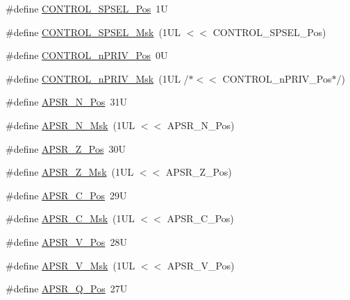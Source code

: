 \begin{DoxyCompactItemize}
\item 
\#define \hyperlink{group___c_m_s_i_s___c_o_r_e_ga07eafc53e609895342c6a530e9d01310}{C\+O\+N\+T\+R\+O\+L\+\_\+\+S\+P\+S\+E\+L\+\_\+\+Pos}~1U
\item 
\#define \hyperlink{group___c_m_s_i_s___c_o_r_e_ga70b29840969b06909da21369b0b05b53}{C\+O\+N\+T\+R\+O\+L\+\_\+\+S\+P\+S\+E\+L\+\_\+\+Msk}~(1\+U\+L $<$$<$ C\+O\+N\+T\+R\+O\+L\+\_\+\+S\+P\+S\+E\+L\+\_\+\+Pos)
\item 
\#define \hyperlink{group___c_m_s_i_s___c_o_r_e_ga51b95bc03ec0d815b459bde0b14a5908}{C\+O\+N\+T\+R\+O\+L\+\_\+n\+P\+R\+I\+V\+\_\+\+Pos}~0U
\item 
\#define \hyperlink{group___c_m_s_i_s___c_o_r_e_gaef3b20d77acb213338f89ce5e7bc36b0}{C\+O\+N\+T\+R\+O\+L\+\_\+n\+P\+R\+I\+V\+\_\+\+Msk}~(1\+U\+L /$\ast$$<$$<$ C\+O\+N\+T\+R\+O\+L\+\_\+n\+P\+R\+I\+V\+\_\+\+Pos$\ast$/)
\item 
\#define \hyperlink{group___c_m_s_i_s___c_o_r_e_gac469528d210043c7bd3f12f0e6824766}{A\+P\+S\+R\+\_\+\+N\+\_\+\+Pos}~31U
\item 
\#define \hyperlink{group___c_m_s_i_s___c_o_r_e_gadbc2cf55a026f661b53fadfcf822cef1}{A\+P\+S\+R\+\_\+\+N\+\_\+\+Msk}~(1\+U\+L $<$$<$ A\+P\+S\+R\+\_\+\+N\+\_\+\+Pos)
\item 
\#define \hyperlink{group___c_m_s_i_s___c_o_r_e_ga3661286d108b1aca308d7445685eae3a}{A\+P\+S\+R\+\_\+\+Z\+\_\+\+Pos}~30U
\item 
\#define \hyperlink{group___c_m_s_i_s___c_o_r_e_ga1deb4d1aa72bb83d1f79329406f15711}{A\+P\+S\+R\+\_\+\+Z\+\_\+\+Msk}~(1\+U\+L $<$$<$ A\+P\+S\+R\+\_\+\+Z\+\_\+\+Pos)
\item 
\#define \hyperlink{group___c_m_s_i_s___c_o_r_e_ga6cf72aa6f09a168f9e5beda1a4a887b9}{A\+P\+S\+R\+\_\+\+C\+\_\+\+Pos}~29U
\item 
\#define \hyperlink{group___c_m_s_i_s___c_o_r_e_ga6d47803fbad455bc10bd1ce59f2f335d}{A\+P\+S\+R\+\_\+\+C\+\_\+\+Msk}~(1\+U\+L $<$$<$ A\+P\+S\+R\+\_\+\+C\+\_\+\+Pos)
\item 
\#define \hyperlink{group___c_m_s_i_s___c_o_r_e_gac62830f67679ccd11658c4172c3e6ea7}{A\+P\+S\+R\+\_\+\+V\+\_\+\+Pos}~28U
\item 
\#define \hyperlink{group___c_m_s_i_s___c_o_r_e_ga33305d6701356bff6890b315fe8b5489}{A\+P\+S\+R\+\_\+\+V\+\_\+\+Msk}~(1\+U\+L $<$$<$ A\+P\+S\+R\+\_\+\+V\+\_\+\+Pos)
\item 
\#define \hyperlink{group___c_m_s_i_s___c_o_r_e_ga298749e176f12827328bb7b92a6b2411}{A\+P\+S\+R\+\_\+\+Q\+\_\+\+Pos}~27U
\item 
$$
\end{DoxyCompactItemize}
